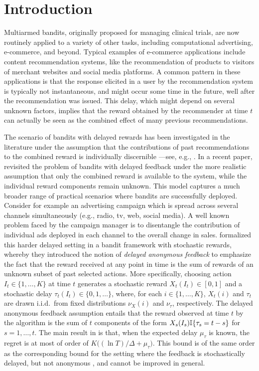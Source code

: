 \section{Introduction}\label{s:intro}
%
Multiarmed bandits, originally proposed for managing clinical trials, are now routinely applied to a variety of other tasks, including computational advertising, e-commerce, and beyond. Typical examples of e-commerce applications include content recommendation systems, like the recommendation of products to visitors of merchant websites and social media platforms. A common pattern in these applications is that the response elicited in a user by the recommendation system is typically not instantaneous, and might occur some time in the future, well after the recommendation was issued. This delay, which might depend on several unknown factors, implies that the reward obtained by the recommender at time $t$ can actually be seen as the combined effect of many previous recommendations.

The scenario of bandits with delayed rewards has been investigated in the literature under the assumption that the contributions of past recommendations to the combined reward is individually discernible ---see, e.g., \citep{neu2010online,joulani2013online,cgmm16,VernadeCP17}. In a recent paper, \citet{pike2017bandits} revisited the problem of bandits with delayed feedback under the more realistic assumption that only the combined reward is available to the system, while the individual reward components remain unknown. This model captures a much broader range of practical scenarios where bandits are successfully deployed. Consider for example an advertising campaign which is spread across several channels simultaneously (e.g., radio, tv, web, social media). A well known problem faced by the campaign manager is to disentangle the contribution of individual ads deployed in each channel to the overall change in sales.
%
\citet{pike2017bandits} formalized this harder delayed setting in a bandit framework with stochastic rewards, whereby they introduced the notion of \textsl{delayed anonymous feedback} to emphasize the fact that the reward received at any point in time is the sum of rewards of an unknown subset of past selected actions. More specifically, choosing action $I_t \in \{1,\dots,K\}$ at time $t$ generates a stochastic reward $X_t(I_t) \in [0,1]$ and a stochastic delay $\tau_t(I_t) \in \{0,1,\dots\}$, where, for each $i \in \{1,\dots,K\}$, $X_t(i)$ and $\tau_t$ are drawn i.i.d.\ from fixed distributions $\nu_X(i)$ and $\nu_{\tau}$, respectively. The delayed anonymous feedback assumption entails that the reward observed at time $t$ by the algorithm is the sum of $t$ components of the form $X_s(I_s)\mathbb{I}{\left\{\tau_s = t-s\right\}}$ for $s=1,\dots,t$.
%
The main result in \citep{pike2017bandits} is that, when the expected delay $\mu_{\tau}$ is known, the regret is at most of order of
$
    K\big((\ln T)/\Delta + \mu_{\tau}\big)
$.
This bound is of the same order as the corresponding bound for the setting where the feedback is stochastically delayed, but not anonymous \citep{joulani2013online}, and cannot be improved in general.



